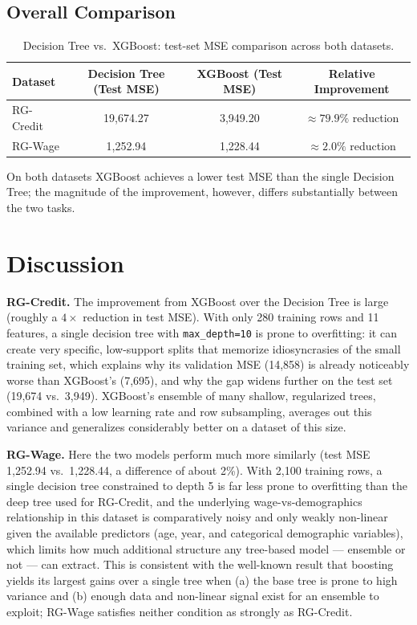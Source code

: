 \documentclass[11pt]{article}
\begin{document}
\subsection{Overall Comparison}
\begin{table}[H]
\centering
\caption{Decision Tree vs.\ XGBoost: test-set MSE comparison across both datasets.}
\label{tab:comparison}
\begin{tabular}{lccc}
\toprule
Dataset & Decision Tree (Test MSE) & XGBoost (Test MSE) & Relative Improvement \\
\midrule
RG-Credit & 19{,}674.27 & 3{,}949.20 & $\approx 79.9\%$ reduction \\
RG-Wage & 1{,}252.94 & 1{,}228.44 & $\approx 2.0\%$ reduction \\
\bottomrule
\end{tabular}
\end{table}
On both datasets XGBoost achieves a lower test MSE than the single Decision Tree; the magnitude of the improvement, however, differs substantially between the two tasks.

\section{Discussion}
\textbf{RG-Credit.} The improvement from XGBoost over the Decision Tree is large (roughly a $4\times$ reduction in test MSE). With only 280 training rows and 11 features, a single decision tree with \texttt{max\_depth=10} is prone to overfitting: it can create very specific, low-support splits that memorize idiosyncrasies of the small training set, which explains why its validation MSE (14{,}858) is already noticeably worse than XGBoost's (7{,}695), and why the gap widens further on the test set (19{,}674 vs.\ 3{,}949). XGBoost's ensemble of many shallow, regularized trees, combined with a low learning rate and row subsampling, averages out this variance and generalizes considerably better on a dataset of this size.

\textbf{RG-Wage.} Here the two models perform much more similarly (test MSE 1{,}252.94 vs.\ 1{,}228.44, a difference of about 2\%). With 2{,}100 training rows, a single decision tree constrained to depth 5 is far less prone to overfitting than the deep tree used for RG-Credit, and the underlying wage-vs-demographics relationship in this dataset is comparatively noisy and only weakly non-linear given the available predictors (age, year, and categorical demographic variables), which limits how much additional structure any tree-based model --- ensemble or not --- can extract. This is consistent with the well-known result that boosting yields its largest gains over a single tree when (a) the base tree is prone to high variance and (b) enough data and non-linear signal exist for an ensemble to exploit; RG-Wage satisfies neither condition as strongly as RG-Credit.
\end{document}
